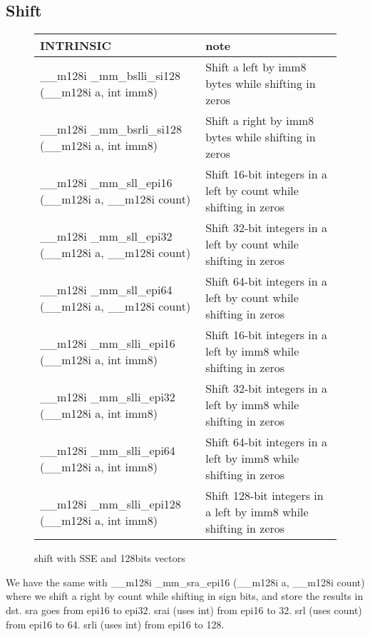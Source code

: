 \documentclass{article}
\begin{document}
\subsection{Shift}
\vspace{1cm}
\begin{figure}[h!]
\noindent
\noindent\begin{tabular}{|l|l|}
  \hline
  INTRINSIC & note \\
  \hline
  \_\_m128i \_mm\_bslli\_si128 (\_\_m128i a, int imm8) & Shift a left by imm8 bytes while shifting in zeros \\
  \hline
   \_\_m128i \_mm\_bsrli\_si128 (\_\_m128i a, int imm8) & Shift a right by imm8 bytes while shifting in zeros \\
  \hline
  \_\_m128i \_mm\_sll\_epi16 (\_\_m128i a, \_\_m128i count)& Shift 16-bit integers in a left by count while shifting in zeros\\
  \hline
  \_\_m128i \_mm\_sll\_epi32 (\_\_m128i a, \_\_m128i count)& Shift 32-bit integers in a left by count while shifting in zeros\\
  \hline
  \_\_m128i \_mm\_sll\_epi64 (\_\_m128i a, \_\_m128i count)& Shift 64-bit integers in a left by count while shifting in zeros\\
  \hline
  \_\_m128i \_mm\_slli\_epi16 (\_\_m128i a, int imm8)&Shift 16-bit integers in a left by imm8 while shifting in zeros \\
  \hline
  \_\_m128i \_mm\_slli\_epi32 (\_\_m128i a, int imm8)&Shift 32-bit integers in a left by imm8 while shifting in zeros \\
  \hline
  \_\_m128i \_mm\_slli\_epi64 (\_\_m128i a, int imm8)&Shift 64-bit integers in a left by imm8 while shifting in zeros \\
  \hline
  \_\_m128i \_mm\_slli\_epi128 (\_\_m128i a, int imm8)&Shift 128-bit integers in a left by imm8 while shifting in zeros \\
  \hline
\end{tabular}
    \caption{shift with SSE and 128bits vectors}
    \label{fig:set of shift 128 instructions}
\end{figure}
We have the same with \_\_m128i \_mm\_sra\_epi16 (\_\_m128i a, \_\_m128i count) where we shift a right by count  while shifting in sign bits, and store the results in dst. sra goes from epi16 to epi32. srai (uses int) from epi16 to 32. srl (uses count) from epi16 to 64. srli (uses int) from epi16 to 128.
\newpage
\end{document}
